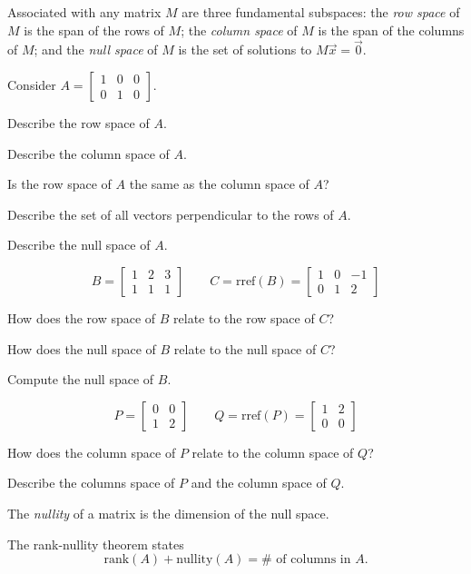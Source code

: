 \documentclass{problemset}
\newcommand{\rref}{\mathrm{rref}}
\newcommand{\rank}{\mathrm{rank}}
\newcommand{\nnul}{\mathrm{nullity}}
\newcommand{\mat}[1]{\begin{bmatrix}#1\end{bmatrix}}
\begin{document}
	\begin{definition}
		Associated with any matrix $M$ are three fundamental subspaces: the \emph{row space}
		of $M$ is the span of the rows of $M$; the \emph{column space} of $M$ is the span
		of the columns of $M$; and the \emph{null space} of $M$ is the set of solutions
		to $M\vec x=\vec 0$. 
		
	\end{definition}

	\question
	Consider $A=\mat{1&0&0\\0&1&0}$.
	\begin{parts}
		\item Describe the row space of $A$.
		\item Describe the column space of $A$.
		\item Is the row space of $A$ the same as the column space of $A$?
		\item Describe the set of all vectors perpendicular to the rows of $A$.
		\item Describe the null space of $A$.
	\end{parts}

	\question
	\[
		B=\mat{1&2&3\\1&1&1}\qquad C=\rref(B)=\mat{1&0&-1\\0&1&2}
	\]
	\begin{parts}
		\item How does the row space of $B$ relate to the row space of $C$?
		\item How does the null space of $B$ relate to the null space of $C$?
		\item Compute the null space of $B$.
	\end{parts}

	\question
	\[
		P=\mat{0&0\\1&2}\qquad Q=\rref(P)=\mat{1&2\\0&0}
	\]
	\begin{parts}
		\item How does the column space of $P$ relate to the column space of $Q$?
		\item Describe the columns space of $P$ and the column space of $Q$.
	\end{parts}

	\begin{theorem}
	The \emph{nullity} of a matrix is the dimension of the null space.

	The rank-nullity theorem states
	\[
		\rank(A)+\nnul(A) = \#\text{ of columns in }A.
	\]
	\end{theorem}
\end{document}
